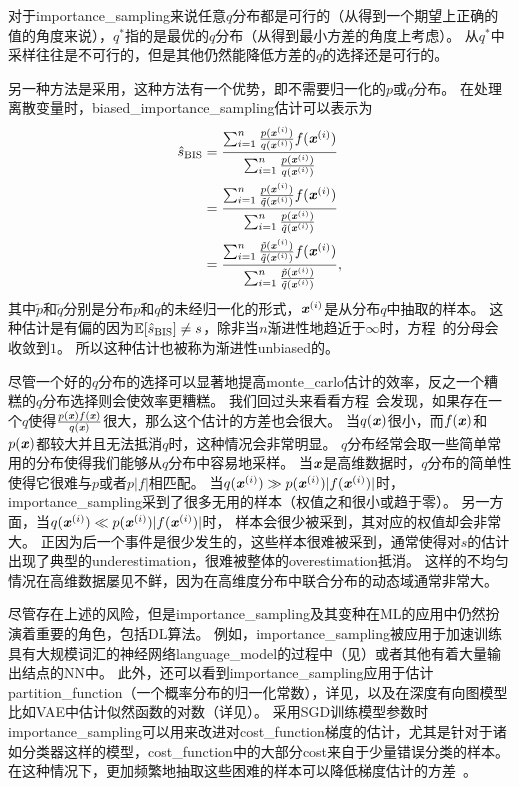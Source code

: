 对于\gls{importance_sampling}来说任意$q$分布都是可行的（从得到一个期望上正确的值的角度来说），$q^*$指的是最优的$q$分布（从得到最小方差的角度上考虑）。
从$q^*$中采样往往是不可行的，但是其他仍然能降低方差的$q$的选择还是可行的。 


另一种方法是采用，这种方法有一个优势，即不需要归一化的$p$或$q$分布。
在处理离散变量时，\gls{biased_importance_sampling}估计可以表示为
\begin{align}
\label{eqn:bis}
\hat{s}_{\text{BIS}} & = \frac{\sum_{i=1}^{n} \frac{p(\boldsymbol{\mathit{x}}^{(i)})}{q(\boldsymbol{\mathit{x}}^{(i)})} f(\boldsymbol{\mathit{x}}^{(i)})}{\sum_{i=1}^{n}\frac{p(\boldsymbol{\mathit{x}}^{(i)})}{q(\boldsymbol{\mathit{x}}^{(i)})}} \\
& = \frac{\sum_{i=1}^{n} \frac{p(\boldsymbol{\mathit{x}}^{(i)})}{\tilde{q}(\boldsymbol{\mathit{x}}^{(i)})} f(\boldsymbol{\mathit{x}}^{(i)})}{\sum_{i=1}^{n}\frac{p(\boldsymbol{\mathit{x}}^{(i)})}{\tilde{q}(\boldsymbol{\mathit{x}}^{(i)})}} \\
& = \frac{\sum_{i=1}^{n} \frac{\tilde{p}(\boldsymbol{\mathit{x}}^{(i)})}{\tilde{q}(\boldsymbol{\mathit{x}}^{(i)})} f(\boldsymbol{\mathit{x}}^{(i)})}{\sum_{i=1}^{n}\frac{\tilde{p}(\boldsymbol{\mathit{x}}^{(i)})}{\tilde{q}(\boldsymbol{\mathit{x}}^{(i)})}},
\end{align}
其中$\tilde{p}$和$\tilde{q}$分别是分布${p}$和${q}$的未经归一化的形式，$\boldsymbol{\mathit{x}}^{(i)}$是从分布${q}$中抽取的样本。
这种估计是有偏的因为$\mathbb{E}[\hat{s}_{\text{BIS}}]\neq s$，除非当$n$渐进性地趋近于$\infty$时，方程~的分母会收敛到$1$。
所以这种估计也被称为渐进性\gls{unbiased}的。   


尽管一个好的$q$分布的选择可以显著地提高\gls{monte_carlo}估计的效率，反之一个糟糕的$q$分布选择则会使效率更糟糕。
我们回过头来看看方程~会发现，如果存在一个$q$使得$\frac{p(\boldsymbol{\mathit{x}})f(\boldsymbol{\mathit{x}})}{q(\boldsymbol{\mathit{x}})}$很大，那么这个估计的方差也会很大。
当$q(\boldsymbol{\mathit{x}})$很小，而$f(\boldsymbol{\mathit{x}})$和$p(\boldsymbol{\mathit{x}})$都较大并且无法抵消$q$时，这种情况会非常明显。
$q$分布经常会取一些简单常用的分布使得我们能够从$q$分布中容易地采样。
当$\boldsymbol{\mathit{x}}$是高维数据时，$q$分布的简单性使得它很难与$p$或者$p\vert f\vert$相匹配。   
当$q(\boldsymbol{\mathit{x}}^{(i)})\gg p(\boldsymbol{\mathit{x}}^{(i)}) \vert f(\boldsymbol{\mathit{x}}^{(i)})\vert $时，\gls{importance_sampling}采到了很多无用的样本（权值之和很小或趋于零）。
另一方面，当$q(\boldsymbol{\mathit{x}}^{(i)})\ll p(\boldsymbol{\mathit{x}}^{(i)}) \vert f(\boldsymbol{\mathit{x}}^{(i)})\vert $时， 样本会很少被采到，其对应的权值却会非常大。
正因为后一个事件是很少发生的，这些样本很难被采到，通常使得对$s$的估计出现了典型的\gls{underestimation}，很难被整体的\gls{overestimation}抵消。
这样的不均匀情况在高维数据屡见不鲜，因为在高维度分布中联合分布的动态域通常非常大。


尽管存在上述的风险，但是\gls{importance_sampling}及其变种在\gls{ML}的应用中仍然扮演着重要的角色，包括\gls{DL}算法。
例如，\gls{importance_sampling}被应用于加速训练具有大规模词汇的神经网络\gls{language_model}的过程中（见）或者其他有着大量输出结点的\gls{NN}中。   
此外，还可以看到\gls{importance_sampling}应用于估计\gls{partition_function}（一个概率分布的归一化常数），详见，以及在深度有向图模型比如\gls{VAE}中估计似然函数的对数（详见）。
采用\gls{SGD}训练模型参数时\gls{importance_sampling}可以用来改进对\gls{cost_function}梯度的估计，尤其是针对于诸如分类器这样的模型，\gls{cost_function}中的大部分\gls{cost}来自于少量错误分类的样本。    
在这种情况下，更加频繁地抽取这些困难的样本可以降低梯度估计的方差~\citep{Hinton06}。 


